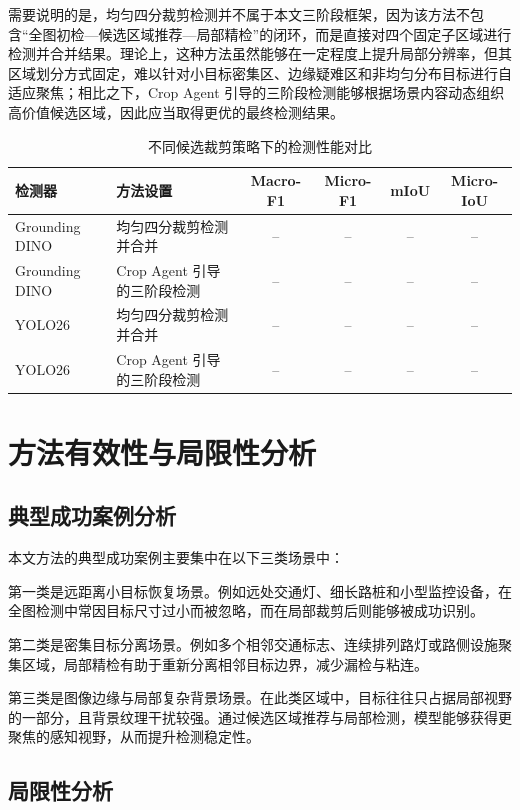 需要说明的是，均匀四分裁剪检测并不属于本文三阶段框架，因为该方法不包含“全图初检—候选区域推荐—局部精检”的闭环，而是直接对四个固定子区域进行检测并合并结果。理论上，这种方法虽然能够在一定程度上提升局部分辨率，但其区域划分方式固定，难以针对小目标密集区、边缘疑难区和非均匀分布目标进行自适应聚焦；相比之下，Crop Agent 引导的三阶段检测能够根据场景内容动态组织高价值候选区域，因此应当取得更优的最终检测结果。

\begin{table}[htbp]
    \centering
    \caption{不同候选裁剪策略下的检测性能对比}
    \label{tab:ablation_crop_agent}
    \begin{tabular}{llcccc}
        \toprule
        检测器 & 方法设置 & Macro-F1 & Micro-F1 & mIoU & Micro-IoU \\
        \midrule
        Grounding DINO & 均匀四分裁剪检测并合并 & -- & -- & -- & -- \\
        Grounding DINO & Crop Agent 引导的三阶段检测 & -- & -- & -- & -- \\
        YOLO26 & 均匀四分裁剪检测并合并 & -- & -- & -- & -- \\
        YOLO26 & Crop Agent 引导的三阶段检测 & -- & -- & -- & -- \\
        \bottomrule
    \end{tabular}
\end{table}

\section{方法有效性与局限性分析}

\subsection{典型成功案例分析}
\label{subsec:success_case_analysis}

本文方法的典型成功案例主要集中在以下三类场景中：

第一类是远距离小目标恢复场景。例如远处交通灯、细长路桩和小型监控设备，在全图检测中常因目标尺寸过小而被忽略，而在局部裁剪后则能够被成功识别。

第二类是密集目标分离场景。例如多个相邻交通标志、连续排列路灯或路侧设施聚集区域，局部精检有助于重新分离相邻目标边界，减少漏检与粘连。

第三类是图像边缘与局部复杂背景场景。在此类区域中，目标往往只占据局部视野的一部分，且背景纹理干扰较强。通过候选区域推荐与局部检测，模型能够获得更聚焦的感知视野，从而提升检测稳定性。

\subsection{局限性分析}
\label{subsec:failure_case_analysis}

